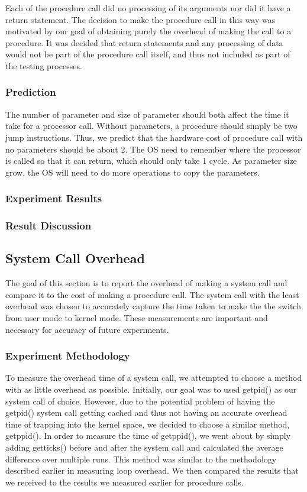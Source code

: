 \documentclass{article} %
\begin{document}
Each of the procedure call did no processing of its arguments nor did it have a return statement. The decision to make the procedure call in this way was motivated by our goal of obtaining purely the overhead of making the call to a procedure. It was decided that return statements and any processing of data would not be part of the procedure call itself, and thus not included as part of the testing processes. 

\subsubsection{Prediction}
The number of parameter and size of parameter should both affect the time it
take for a processor call. Without parameters, a procedure should simply be two
jump instructions. Thus, we predict that the hardware cost of procedure call
with no parameters should be about 2. The OS need to remember where the
processor is called so that it can return, which should only take 1 cycle. As
parameter size grow, the OS will need to do more operations to copy the
parameters.
\subsubsection{Experiment Results}
\subsubsection{Result Discussion}


\subsection{System Call Overhead}
The goal of this section is to report the overhead of making a system call and compare it to the cost of making a procedure call. The system call with the least overhead was chosen to accurately capture the time taken to make the the switch from user mode to kernel mode. These measurements are important and necessary for accuracy of future experiments.

\subsubsection{Experiment Methodology}
To measure the overhead time of a system call, we attempted to choose a method with as little overhead as possible. Initially, our goal was to used getpid() as our system call of choice. However, due to the potential problem of having the getpid() system call getting cached and thus not having an accurate overhead time of trapping into the kernel space, we decided to choose a similar method, getppid(). In order to measure the time of getppid(), we went about by simply adding getticks() before and after the system call and calculated the average difference over multiple runs. This method was similar to the methodology described earlier in measuring loop overhead. We then compared the results that we received to the results we measured earlier for procedure calls.
\end{document}
